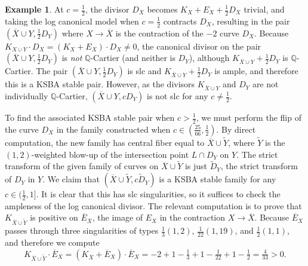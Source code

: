 \documentclass[11pt]{amsart}
\numberwithin{equation}{section}
\theoremstyle{definition}
\newtheorem{example}[theorem]{Example}
\newcommand{\bQ}{\mathbb{Q}}
\begin{document}
\begin{example}
    At $c = \frac{1}{2}$, the divisor $D_X$ becomes $K_X+E_X + \frac{1}{2}D_X$ trivial, and taking the log canonical model when $c = \frac{1}{2}$ contracts $D_X$, resulting in the pair $(\overline{X} \cup Y, \frac{1}{2}D_Y)$ where $X \to \overline{X}$ is the contraction of the $-2$ curve $D_X$.  Because $K_{X \cup Y} \cdot D_X = (K_X + E_X) \cdot D_X \ne 0$, the canonical divisor on the pair $(\overline{X} \cup Y, \frac{1}{2}D_Y)$ is \textit{not} $\bQ$-Cartier (and neither is $D_Y$), although $K_{\overline{X} \cup Y} + \frac{1}{2} D_Y$ is $\bQ$-Cartier.  The pair $(\overline{X} \cup Y, \frac{1}{2}D_Y)$ is slc and $K_{\overline{X} \cup Y} + \frac{1}{2} D_Y$ is ample, and therefore this is a KSBA stable pair.  However, as the divisors $K_{\overline{X} \cup Y}$ and $D_Y$ are not individually $\bQ$-Cartier, $(\overline{X} \cup Y, cD_Y)$ is not slc for any $c \ne \frac{1}{2}$.  

    To find the associated KSBA stable pair when $c > \frac{1}{2}$, we must perform the flip of the curve $D_X$ in the family constructed when  $c \in (\frac{25}{66}, \frac{1}{2})$.  By direct computation, the new family has central fiber equal to $\overline{X} \cup \tilde{Y}$, where $\tilde{Y}$ is the $(1,2)$-weighted blow-up of the intersection point $L \cap D_Y$ on $Y$.  The strict transform of the given family of curves on $\overline{X} \cup \tilde{Y}$ is just $\tilde{D}_Y$, the strict transform of $D_Y$ in $Y$.  We claim that $(\overline{X} \cup \tilde{Y}, c \tilde{D}_Y)$ is a KSBA stable family for any $c \in (\frac{1}{2},1]$.  It is clear that this has slc singularities, so it suffices to check the ampleness of the log canonical divisor.  The relevant computation is to prove that $K_{\overline{X} \cup \tilde{Y}}$ is positive on $\overline{E}_X$, the image of $E_X$ in the contraction $X \to \overline{X}$.  Because $\overline{E}_X$ passes through three singularities of types $\frac{1}{3}(1,2)$, $\frac{1}{22}(1,19)$, and $\frac{1}{2}(1,1)$, and therefore we compute 
    \[ K_{\overline{X} \cup \tilde{Y}} \cdot \overline{E}_X = (K_{\overline{X}} + \overline{E}_X) \cdot \overline{E}_X = -2 + 1 - \tfrac{1}{3} + 1 - \tfrac{1}{22} + 1 - \tfrac{1}{2} = \tfrac{4}{33} > 0.\]

\begin{figure}[h]
\end{figure}
\end{example}
\end{document}
